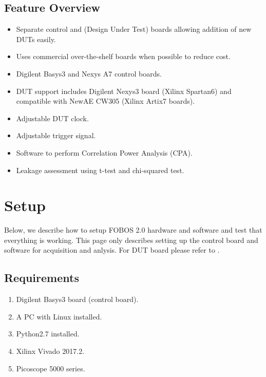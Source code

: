 \documentclass[letterpaper,10pt,english]{sphinxmanual}
\begin{document}
\section{Feature Overview}
\label{\detokenize{introduction:feature-overview}}\begin{itemize}
\item {} 
Separate control and (Design Under Test) boards allowing addition of new DUTs easily.

\item {} 
Uses commercial over-the-shelf boards when possible to reduce cost.

\item {} 
Digilent Basys3 and Nexys A7 control boards.

\item {} 
DUT support includes Digilent Nexys3 board (Xilinx Spartan6) and compatible with NewAE CW305
(Xilinx Artix7 boards).

\item {} 
Adjustable DUT clock.

\item {} 
Adjustable trigger signal.

\item {} 
Software to perform Correlation Power Analysis (CPA).

\item {} 
Leakage assessment using t-test and chi-squared test.

\end{itemize}


\chapter{Setup}
\label{\detokenize{setup:setup}}\label{\detokenize{setup::doc}}
Below, we describe how to setup FOBOS 2.0 hardware and software and test that everything is working.
This page only describes setting up the control board and software for acquisition and anlysis.
For DUT board please refer to {\hyperref[\detokenize{dut_board_setup:dut-board-setup-label}]{}}.


\section{Requirements}
\label{\detokenize{setup:requirements}}\begin{enumerate}
\def\theenumi{\arabic{enumi}}
\def\labelenumi{\theenumi .}
\makeatletter\def\p@enumii{\p@enumi \theenumi .}\makeatother
\item {} 
Digilent Basys3 board (control board).

\item {} 
A PC with Linux installed.

\item {} 
Python2.7 installed.

\item {} 
Xilinx Vivado 2017.2.

\item {} 
Picoscope 5000 series.

\end{enumerate}
\end{document}
